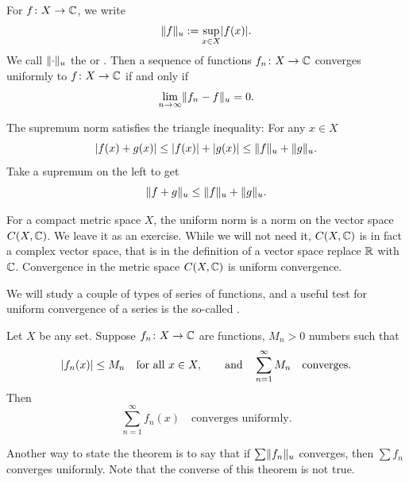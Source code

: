 For $f \colon X \to {\mathbb{C}}$, we write
\begin{equation*}
\lVert {f} \rVert_u := \sup_{x \in X} \lvert {f(x)} \rvert .
\end{equation*}
We call $\lVert {\cdot} \rVert_u$
the \emph{} or \emph{}.
Then a sequence of functions
$f_n \colon X \to {\mathbb{C}}$ converges uniformly to $f \colon X \to {\mathbb{C}}$ if and only if
\begin{equation*}
\lim_{n\to \infty} \lVert {f_n-f} \rVert_u = 0 .
\end{equation*}

The supremum norm satisfies the triangle inequality: For any $x \in X$
\begin{equation*}
\lvert {f(x)+g(x)} \rvert \leq
\lvert {f(x)} \rvert+\lvert {g(x)} \rvert \leq
\lVert {f} \rVert_u+\lVert {g} \rVert_u .
\end{equation*}
Take a supremum on the left to get
\begin{equation*}
\lVert {f+g} \rVert_u \leq
\lVert {f} \rVert_u+\lVert {g} \rVert_u .
\end{equation*}

For a compact metric space $X$,
the uniform norm is a norm on the vector space $C(X,{\mathbb{C}})$.
We leave it as an exercise.
While we will not need it, $C(X,{\mathbb{C}})$ is in fact a complex
vector space, that is in the definition of a vector space replace
${\mathbb{R}}$ with ${\mathbb{C}}$.
Convergence in the metric space $C(X,{\mathbb{C}})$ is
uniform convergence.

We will study a couple of types of series of functions, and
a useful test for uniform convergence of a series is the 
so-called \emph{}.

\begin{thm} \label{thm:weiermtest}
Let $X$ be any set.
Suppose $f_n \colon X \to {\mathbb{C}}$ are functions, $M_n > 0$ numbers such
that
\begin{equation*}
\lvert {f_n(x)} \rvert\leq M_n \quad \text{for all } x \in X,
\qquad \text{and} \quad
\sum_{n=1}^\infty M_n
\quad \text{converges}.
\end{equation*}
Then
\begin{equation*}
\sum_{n=1}^\infty f_n(x)
\quad \text{converges uniformly}.
\end{equation*}
\end{thm}

Another way to state the theorem is to say that if
$\sum \lVert {f_n} \rVert_u$ converges, then $\sum f_n$ converges uniformly.
Note that the converse of this theorem is not true.

